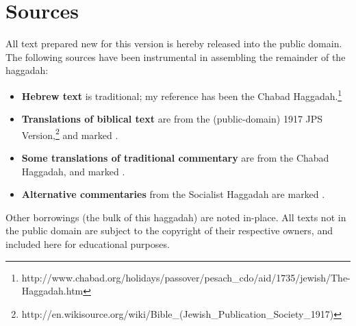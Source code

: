 \documentclass[a4paper,10pt,openany]{memoir}
\newcommand{\CSrc}{}
\newcommand{\JSrc}{\textsuperscript{\upshape{[J]}}}
\newcommand{\LSrc}{\textsuperscript{\upshape{[L]}}}
\newcommand{\SSrc}{\textsuperscript{\upshape{[S]}}}
\begin{document}
\section*{Sources}

All text prepared new for this version is 
hereby released
into the public domain. The following sources have been instrumental in
assembling the remainder of the haggadah:
\begin{itemize}
  \item {\bfseries Hebrew text} is traditional; my reference has been the Chabad
    Haggadah.\footnote{http://www.chabad.org/holidays/passover/pesach\_cdo/aid/1735/jewish/The-Haggadah.htm}
  \item {\bfseries Translations of biblical text} are from the (public-domain)
    1917 JPS
    Version,\footnote{http://en.wikisource.org/wiki/Bible\_(Jewish\_Publication\_Society\_1917)}
    and marked \JSrc.
  \item {\bfseries Some translations of traditional commentary} are from the
    Chabad Haggadah, and marked \LSrc.
  \item {\bfseries Alternative commentaries} from the Socialist Haggadah
    are marked \SSrc.
\end{itemize}
Other borrowings (the bulk of this haggadah) are noted in-place. All texts not
in the public domain are subject to the copyright of their respective owners,
and included here for educational purposes.
\end{document}
